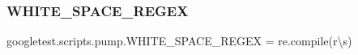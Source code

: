 \subsubsection{\texorpdfstring{WHITE\_SPACE\_REGEX}{WHITE\_SPACE\_REGEX}}
{\footnotesize\ttfamily googletest.\+scripts.\+pump.\+W\+H\+I\+T\+E\+\_\+\+S\+P\+A\+C\+E\+\_\+\+R\+E\+G\+EX = re.\+compile(r\textquotesingle{}\textbackslash{}s\textquotesingle{})}

